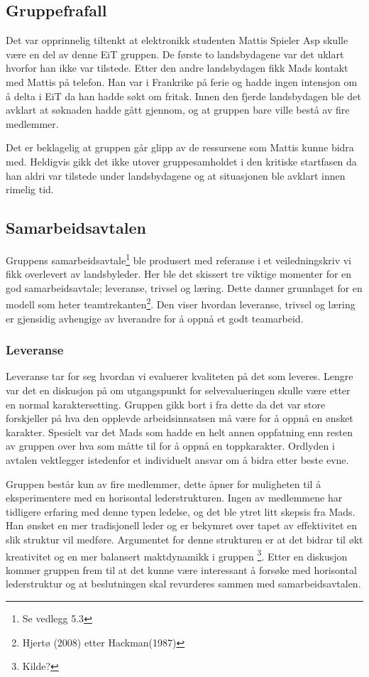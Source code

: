 \subsection{Gruppefrafall}
Det var opprinnelig tiltenkt at elektronikk studenten Mattis Spieler Asp skulle være en del av denne EiT gruppen. De første to landsbydagene var det uklart hvorfor han ikke var tilstede. Etter den andre landsbydagen fikk Mads kontakt med Mattis på telefon. Han var i Frankrike på ferie og hadde ingen intensjon om å delta i EiT da han hadde søkt om fritak. Innen den fjerde landsbydagen ble det avklart at søknaden hadde gått gjennom, og at gruppen bare ville bestå av fire medlemmer.

Det er beklagelig at gruppen går glipp av de ressursene som Mattis kunne bidra med. Heldigvis gikk det ikke utover gruppesamholdet i den kritiske startfasen da han aldri var tilstede under landsbydagene og at situasjonen ble avklart innen rimelig tid. 

\subsection{Samarbeidsavtalen}
Gruppens samarbeidsavtale\footnote{Se vedlegg 5.3} ble produsert med referanse i et veiledningskriv vi fikk overlevert av landsbyleder. Her ble det skissert tre viktige momenter for en god samarbeidsavtale; leveranse, trivsel og læring. Dette danner grunnlaget for en modell som heter teamtrekanten\footnote{Hjertø (2008) etter Hackman(1987)}. Den viser hvordan leveranse, trivsel og læring er gjensidig avhengige av hverandre for å oppnå et godt teamarbeid.
\subsubsection{Leveranse}
Leveranse tar for seg hvordan vi evaluerer kvaliteten på det som leveres. Lengre var det en diskusjon på om utgangspunkt for selvevalueringen skulle være etter en normal karaktersetting. Gruppen gikk bort i fra dette da det var store forskjeller på hva den opplevde arbeidsinnsatsen må være for å oppnå en ønsket karakter. Spesielt var det Mads som hadde en helt annen oppfatning enn resten av gruppen over hva som måtte til for å oppnå en toppkarakter. Ordlyden i avtalen vektlegger istedenfor et individuelt ansvar om å bidra etter beste evne. 

Gruppen består kun av fire medlemmer, dette åpner for muligheten til å eksperimentere med en horisontal lederstrukturen. Ingen av medlemmene har tidligere erfaring med denne typen ledelse, og det ble ytret litt skepsis fra Mads. Han ønsket en mer tradisjonell leder og er bekymret over tapet av effektivitet en slik struktur vil medføre. Argumentet for denne strukturen er at det bidrar til økt kreativitet og en mer balansert maktdynamikk i gruppen \footnote{Kilde?}. Etter en diskusjon kommer gruppen frem til at det kunne være interessant å forsøke med horisontal lederstruktur og at beslutningen skal revurderes sammen med samarbeidsavtalen.

